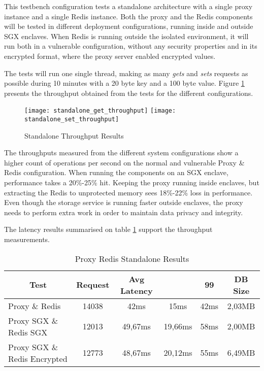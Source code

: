 This testbench configuration tests a standalone architecture with a single proxy instance and a single Redis instance. Both the proxy and the Redis components will be tested in different deployment configurations, running inside and outside \gls{SGX} enclaves. When Redis is running outside the isolated environment, it will run both in a vulnerable configuration, without any security properties and in its encrypted format, where the proxy server enabled encrypted values.

The tests will run one single thread, making as many \textit{gets} and \textit{sets} requests as possible during 10 minutes with a 20 byte key and a 100 byte value. Figure \ref{fig:standalone_throughput_results} presents the throughput obtained from the tests for the different configurations.

\begin{figure}[htbp]
  \centering
    {\texttt{[image: standalone\_get\_throughput]}}%
    {\texttt{[image: standalone\_set\_throughput]}}%
  \caption{Standalone Throughput Results}
  \label{fig:standalone_throughput_results}
\end{figure}

The throughputs measured from the different system configurations show a higher count of operations per second on the normal and vulnerable Proxy \& Redis configuration. When running the components on an \gls{SGX} enclave, performance takes a 20\%-25\% hit. Keeping the proxy running inside enclaves, but extracting the Redis to unprotected memory sees 18\%-22\% loss in performance. Even though the storage service is running faster outside enclaves, the proxy needs to perform extra work in order to maintain data privacy and integrity.
 
The latency results summarised on table \ref{tab:proxy_redis_standalone_latency_results} support the throughput measurements.

\begin{table}[ht]
	\caption{Proxy Redis Standalone Results}
	\label{tab:proxy_redis_standalone_latency_results}
\centering
\begin{tabular}{lccccc}
	\toprule
	\multicolumn{1}{c}{\textbf{Test}} & \pmb{\#}\textbf{Request} & \textbf{Avg Latency} & \pmb{\ensuremath{\sigma}} & \textbf{99}\pmb{\%} & \textbf{DB Size} \\
	\midrule
		Proxy \& Redis & 14038 & 42ms & 15ms & 42ms & 2,03MB 	\\
		Proxy SGX \& Redis SGX & 12013 & 49,67ms & 19,66ms & 58ms & 2,00MB \\
		Proxy SGX \& Redis Encrypted & 12773 & 48,67ms & 20,12ms & 55ms & 6,49MB \\
	\bottomrule
\end{tabular}
\end{table}

